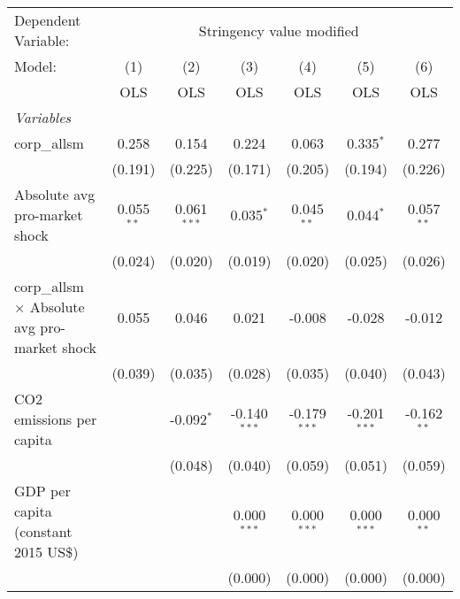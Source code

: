
\begingroup
\centering
\begin{tabular}{lcccccc}
   \toprule
   Dependent Variable: & \multicolumn{6}{c}{Stringency value modified}\\
   Model:                                               & (1)          & (2)           & (3)            & (4)            & (5)            & (6)\\  
                                                        &  OLS         & OLS           & OLS            & OLS            & OLS            & OLS\\  
   \midrule
   \emph{Variables}\\
   corp\_allsm                                          & 0.258        & 0.154         & 0.224          & 0.063          & 0.335$^{*}$    & 0.277\\   
                                                        & (0.191)      & (0.225)       & (0.171)        & (0.205)        & (0.194)        & (0.226)\\   
   Absolute avg pro-market shock                        & 0.055$^{**}$ & 0.061$^{***}$ & 0.035$^{*}$    & 0.045$^{**}$   & 0.044$^{*}$    & 0.057$^{**}$\\   
                                                        & (0.024)      & (0.020)       & (0.019)        & (0.020)        & (0.025)        & (0.026)\\   
   corp\_allsm $\times$ Absolute avg pro-market shock   & 0.055        & 0.046         & 0.021          & -0.008         & -0.028         & -0.012\\   
                                                        & (0.039)      & (0.035)       & (0.028)        & (0.035)        & (0.040)        & (0.043)\\   
   CO2 emissions per capita                             &              & -0.092$^{*}$  & -0.140$^{***}$ & -0.179$^{***}$ & -0.201$^{***}$ & -0.162$^{**}$\\   
                                                        &              & (0.048)       & (0.040)        & (0.059)        & (0.051)        & (0.059)\\   
   GDP per capita (constant 2015 US\$)                  &              &               & 0.000$^{***}$  & 0.000$^{***}$  & 0.000$^{***}$  & 0.000$^{**}$\\   
                                                        &              &               & (0.000)        & (0.000)        & (0.000)        & (0.000)\\   

\end{tabular}
